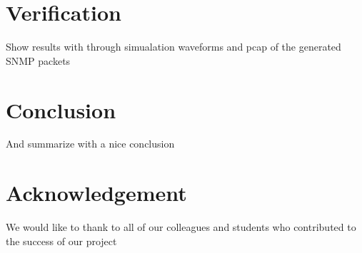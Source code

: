 \documentclass[conference]{IEEEtran}
\begin{document}
\section{Verification}

Show results with through simualation waveforms and pcap of the generated SNMP packets

\section{Conclusion}

And summarize with a nice conclusion\cite{Williams_Web_Workload_Characterization_10_Years}

\section{Acknowledgement}
We would like to thank to all of our colleagues and students who contributed to the success of our project






%

%
%
\end{document}
